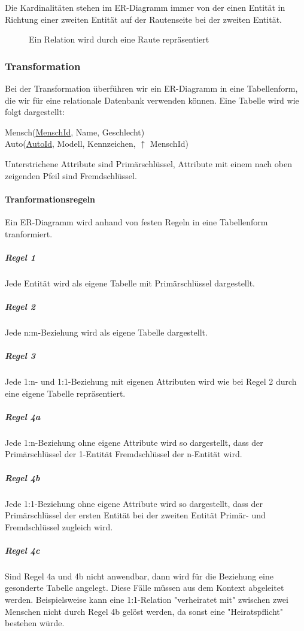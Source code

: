 \documentclass{article}
\begin{document}
	Die Kardinalitäten stehen im ER-Diagramm immer von der einen Entität in Richtung einer zweiten Entität auf der Rautenseite bei der zweiten Entität.

	\begin{figure}[h!]
		\centering
		
		\caption{Ein Relation wird durch eine Raute repräsentiert}
	\end{figure}

	\subsubsection{Transformation}
	Bei der Transformation überführen wir ein ER-Diagramm in eine Tabellenform, die wir für eine relationale Datenbank verwenden können.
	Eine Tabelle wird wie folgt dargestellt:
	\begin{center}
		Mensch(\underline{MenschId}, Name, Geschlecht) \\
		Auto(\underline{AutoId}, Modell, Kennzeichen, $\uparrow$ MenschId)
	\end{center}
	Unterstrichene Attribute sind Primärschlüssel, Attribute mit einem nach oben zeigenden Pfeil sind Fremdschlüssel.

	\paragraph{Tranformationsregeln}
	Ein ER-Diagramm wird anhand von festen Regeln in eine Tabellenform tranformiert.

	\subparagraph{Regel 1}
	Jede Entität wird als eigene Tabelle mit Primärschlüssel dargestellt.

	\subparagraph{Regel 2}
	Jede n:m-Beziehung wird als eigene Tabelle dargestellt.

	\subparagraph{Regel 3}
	Jede 1:n- und 1:1-Beziehung mit eigenen Attributen wird wie bei Regel 2 durch eine eigene Tabelle repräsentiert.

	\subparagraph{Regel 4a}
	Jede 1:n-Beziehung ohne eigene Attribute wird so dargestellt, dass der Primärschlüssel der 1-Entität Fremdschlüssel der n-Entität wird.

	\subparagraph{Regel 4b}
	Jede 1:1-Beziehung ohne eigene Attribute wird so dargestellt, dass der Primärschlüssel der ersten Entität bei der zweiten Entität Primär- und Fremdschlüssel zugleich wird.

	\subparagraph{Regel 4c}
	Sind Regel 4a und 4b nicht anwendbar, dann wird für die Beziehung eine gesonderte Tabelle angelegt. Diese Fälle müssen aus dem Kontext abgeleitet werden.
	Beispielsweise kann eine 1:1-Relation "verheiratet mit" zwischen zwei Menschen nicht durch Regel 4b gelöst werden, da sonst eine "Heiratspflicht" bestehen würde.
\end{document}

